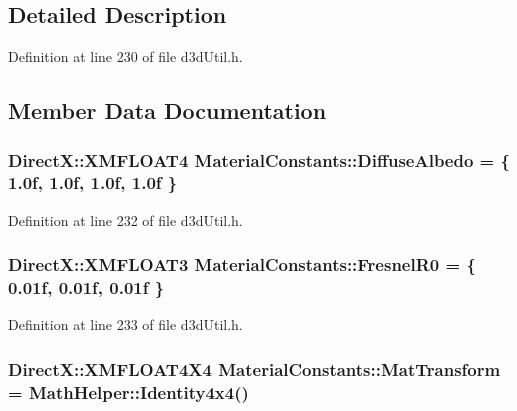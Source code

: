 \subsection{Detailed Description}


Definition at line 230 of file d3d\+Util.\+h.



\subsection{Member Data Documentation}
\subsubsection[{\texorpdfstring{Diffuse\+Albedo}{DiffuseAlbedo}}]{\setlength{\rightskip}{0pt plus 5cm}Direct\+X\+::\+X\+M\+F\+L\+O\+A\+T4 Material\+Constants\+::\+Diffuse\+Albedo = \{ 1.\+0f, 1.\+0f, 1.\+0f, 1.\+0f \}}\hypertarget{struct_material_constants_a83cf6d979493301808d0e4b350c3e0a4_a83cf6d979493301808d0e4b350c3e0a4}{}\label{struct_material_constants_a83cf6d979493301808d0e4b350c3e0a4_a83cf6d979493301808d0e4b350c3e0a4}


Definition at line 232 of file d3d\+Util.\+h.

\subsubsection[{\texorpdfstring{Fresnel\+R0}{FresnelR0}}]{\setlength{\rightskip}{0pt plus 5cm}Direct\+X\+::\+X\+M\+F\+L\+O\+A\+T3 Material\+Constants\+::\+Fresnel\+R0 = \{ 0.\+01f, 0.\+01f, 0.\+01f \}}\hypertarget{struct_material_constants_a7b2282a2a351b4327324fc7456a1cd85_a7b2282a2a351b4327324fc7456a1cd85}{}\label{struct_material_constants_a7b2282a2a351b4327324fc7456a1cd85_a7b2282a2a351b4327324fc7456a1cd85}


Definition at line 233 of file d3d\+Util.\+h.

\subsubsection[{\texorpdfstring{Mat\+Transform}{MatTransform}}]{\setlength{\rightskip}{0pt plus 5cm}Direct\+X\+::\+X\+M\+F\+L\+O\+A\+T4\+X4 Material\+Constants\+::\+Mat\+Transform = {\bf Math\+Helper\+::\+Identity4x4}()}\hypertarget{struct_material_constants_a5d631fb90e1b2557008841d059c322c8_a5d631fb90e1b2557008841d059c322c8}{}\label{struct_material_constants_a5d631fb90e1b2557008841d059c322c8_a5d631fb90e1b2557008841d059c322c8}


